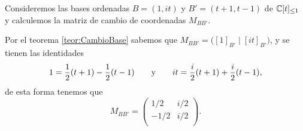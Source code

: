 \begin{example}
  Consideremos las bases ordenadas $B = ( 1, it )$ y $B' = (t+1, t-1)$ de $\mathbb{C}[t]_{\leq 1}$ y calculemos la matriz de cambio de coordenadas $M_{BB'}$.

  \examplesolution

  Por el teorema \ref{teor:CambioBase} sabemos que $M_{BB'} = \bigl( [1]_{B'} \mid [it]_{B'} \bigr)$, y se tienen las identidades
  \[
    1 = \frac{1}{2} (t+1) - \frac{1}{2}(t-1)
      \qquad\text{y}\qquad
    it =  \frac{i}{2}(t+1) + \frac{i}{2}(t-1),
  \]
  de esta forma tenemos que 
  \[ M_{BB'} = \begin{pmatrix}
    1/2  & i/2 \\
    -1/2 & i/2 \\
  \end{pmatrix}. \]
\end{example}

